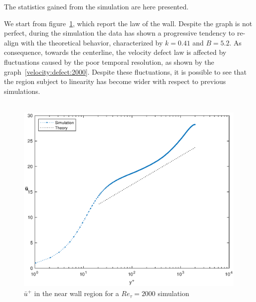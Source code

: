 The statistics gained from the simulation are here presented.\par
We start from figure~\ref{loglaw:2000}, which report the law of the wall. Despite the graph is not perfect, during the simulation the data has shown a progressive tendency to re-align with the theoretical behavior, characterized by $k=0.41$ and $B=5.2$. As consequence, towards the centerline, the velocity defect law is affected by fluctuations caused by the poor temporal resolution, as shown by the graph~\ref{velocity:defect:2000}. Despite these fluctuations, it is possible to see that the region subject to linearity has become wider with respect to previous simulations. \\~\par

\begin{figure}
\begin{center}
\includegraphics[scale=0.55]{grafici/loglaw_2000.eps}
\caption{$\bar{u}^{+}$ in the near wall region for a $Re_{\tau}=2000$ simulation}
\label{loglaw:2000}
\end{center} 
\end{figure}

